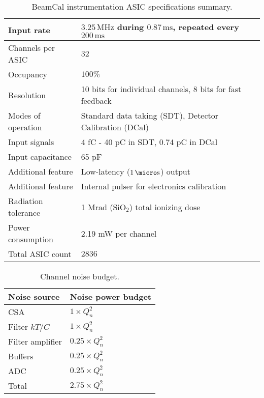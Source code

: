 \begin{table}[!t]
	\begin{center}
		\begin{tabular}{|l|l|}\hline
			Input rate & $3.25\,\text{MHz}$ during $0.87\,\text{ms}$, repeated every $200\,\text{ms}$ \\ \hline
			Channels per ASIC & $32$ \\ \hline
			Occupancy & $100\%$ \\ \hline
			Resolution & 10 bits for individual channels, 8 bits for fast feedback \\ \hline
			Modes of operation & Standard data taking (SDT), Detector Calibration (DCal) \\ \hline
			Input signals & 4 fC - 40 pC in SDT, 0.74 pC in DCal \\ \hline
			Input capacitance & 65 pF \\ \hline
			Additional feature & Low-latency ($1\,\micro\text{s}$) output \\ \hline
			Additional feature & Internal pulser for electronics calibration \\ \hline
			Radiation tolerance & 1 Mrad ($\text{SiO}_2$) total ionizing dose \\ \hline
			Power consumption & 2.19 mW per channel \\ \hline
			Total ASIC count & $2836$ \\\hline
		\end{tabular}
		\vspace*{5pt}
		\caption{BeamCal instrumentation ASIC specifications summary.}\label{tab:bean_specs}
	\end{center}
\end{table}

\begin{table}[!t]
	\begin{center}
		\begin{tabular}{|l|l|}\hline
			{\bf Noise source} & {\bf Noise power budget} \\ \hline\hline
			CSA & $1\times Q_n^2$ \\ \hline
			Filter $kT/C$ & $1\times Q_n^2$ \\ \hline
			Filter amplifier & $0.25\times Q_n^2$ \\\hline 
			Buffers & $0.25\times Q_n^2$ \\ \hline
			ADC & $0.25\times Q_n^2$ \\ \hline
			Total & $2.75\times Q_n^2$ \\\hline
		\end{tabular}
		\vspace*{5pt}
		\caption{Channel noise budget.}\label{tab:noise_budget}
	\end{center}
\end{table}